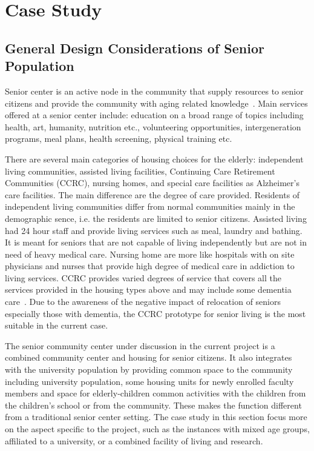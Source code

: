 
\chapter{Case Study} %

\label{Chapter2} %



\section{General Design Considerations of Senior Population}
Senior center is an active node in the community that supply resources
to senior citizens and provide the community with aging related
knowledge~\cite{Dalsanto2009}. Main services offered at a senior
center include: education on a broad range of topics including health,
art, humanity, nutrition etc., volunteering opportunities,
intergeneration programs, meal plans, health screening, physical
training etc. 

There are several main categories of housing choices for the elderly:
independent living communities, assisted living facilities, Continuing
Care Retirement Communities (CCRC), nursing homes, and special care
facilities as Alzheimer's care facilities. The main difference are the
degree of care provided. Residents of independent living communities
differ from normal communities mainly in the demographic sence,
i.e. the residents are limited to senior citizens. Assisted living had
24 hour staff and provide living services such as meal, laundry and
bathing. It is meant for seniors that are not capable of living
independently but are not in need of heavy medical care. Nursing home
are more like hospitals with on site physicians and nurses that
provide high degree of medical care in addiction to living
services. CCRC provides varied degrees of service that covers all the
services provided in the housing types above and may include some
dementia care~\cite{JFCS2015}. Due to the awareness of the negative
impact of relocation of seniors especially those with dementia, the
CCRC prototype for senior living is the most suitable in the current
case.

The senior community center under discussion in the current project is
a combined community center and housing for senior citizens. It also
integrates with the university population by providing common space to
the community including university population, some housing units for
newly enrolled faculty members and space for elderly-children common
activities with the children from the children's school or from the
community. These makes the function different from a traditional
senior center setting. The case study in this section focus more on
the aspect specific to the project, such as the instances with mixed
age groups, affiliated to a university, or a combined facility of
living and research.

